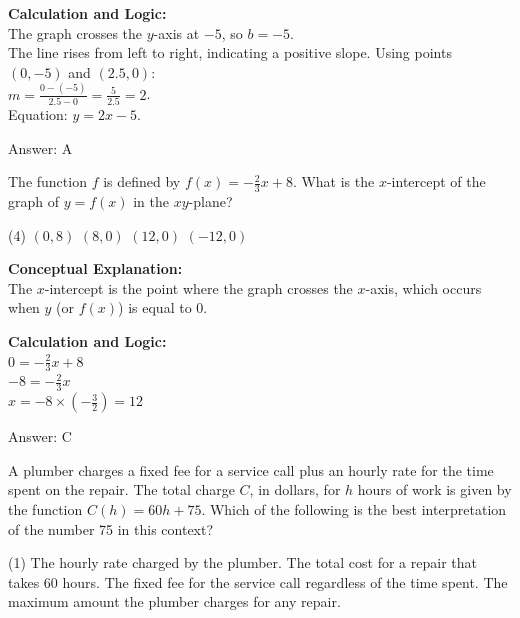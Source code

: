 \documentclass[11pt,paper=a4,answers]{exam}
\begin{document}
\begin{questions}
\begin{solution}
\vspace{10pt}
\textbf{Calculation and Logic:} \\
The graph crosses the $y$-axis at $-5$, so $b = -5$. \\
The line rises from left to right, indicating a positive slope. Using points $(0, -5)$ and $(2.5, 0)$: \\
$m = \frac{0 - (-5)}{2.5 - 0} = \frac{5}{2.5} = 2$. \\
Equation: $y = 2x - 5$.

\vspace{15pt}
Answer: \colorbox{yellow!100}{A}
\end{solution}

\vspace{20pt}

\question
The function $f$ is defined by $f(x) = -\frac{2}{3}x + 8$. What is the $x$-intercept of the graph of $y = f(x)$ in the $xy$-plane?
\begin{tasks}(4)
    \task $(0, 8)$
    \task $(8, 0)$
    \task $(12, 0)$
    \task $(-12, 0)$
\end{tasks}

\begin{solution}
\textbf{Conceptual Explanation:} \\
The $x$-intercept is the point where the graph crosses the $x$-axis, which occurs when $y$ (or $f(x)$) is equal to 0.

\vspace{10pt}
\textbf{Calculation and Logic:} \\
$0 = -\frac{2}{3}x + 8$ \\
$-8 = -\frac{2}{3}x$ \\
$x = -8 \times \left(-\frac{3}{2}\right) = 12$

\vspace{15pt}
Answer: \colorbox{yellow!100}{C}
\end{solution}

\vspace{20pt}

\question
A plumber charges a fixed fee for a service call plus an hourly rate for the time spent on the repair. The total charge $C$, in dollars, for $h$ hours of work is given by the function $C(h) = 60h + 75$. Which of the following is the best interpretation of the number 75 in this context?
\begin{tasks}(1)
    \task The hourly rate charged by the plumber.
    \task The total cost for a repair that takes 60 hours.
    \task The fixed fee for the service call regardless of the time spent.
    \task The maximum amount the plumber charges for any repair.
\end{tasks}


\end{questions}
\end{document}

